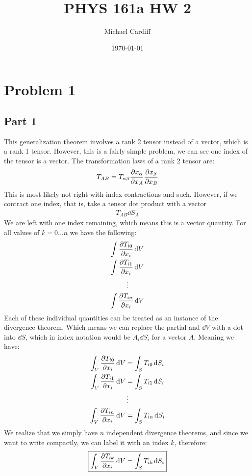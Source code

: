 \documentclass[12pt]{article}
\title{\vspace{-3em}PHYS 161a HW 2}
\author{Michael Cardiff}
\date{\today}
\begin{document}
\maketitle

\section*{Problem 1}
\subsection*{Part 1}
This generalization theorem involves a rank 2 tensor instead of a vector, which is a rank 1 tensor. However, this is a fairly simple problem, we can see one index of the tensor is a vector. The transformation laws of a rank 2 tensor are:
\begin{align*}
  T_{AB}=T_{\alpha\beta}\pdv{x_\alpha}{x_A}\pdv{x_\beta}{x_B}
\end{align*}
This is most likely not right with index contractions and such. However, if we contract one index, that is, take a tensor dot product with a vector
\begin{align*}
  T_{AB}\dd{S}_A
\end{align*}
We are left with one index remaining, which means this is a vector quantity. For all values of $k=0...n$ we have the following:
\begin{gather*}
  \int\pdv{T_{i0}}{x_i}\dd{V}\\
  \int\pdv{T_{i1}}{x_i}\dd{V}\\
  \vdots\\
  \int\pdv{T_{in}}{x_i}\dd{V}
\end{gather*}
Each of these individual quantities can be treated as an instance of the divergence theorem. Which means we can replace the partial and $\dd{V}$ with a dot into $\dd{S}$, which in index notation would be $A_i\dd{S_i}$ for a vector $A$. Meaning we have:
\begin{gather*}
  \int_V\pdv{T_{i0}}{x_i}\dd{V}=\int_S T_{i0}\dd{S_i}\\
  \int_V\pdv{T_{i1}}{x_i}\dd{V}=\int_S T_{i1}\dd{S_i}\\
  \vdots\\
  \int_V\pdv{T_{in}}{x_i}\dd{V}=\int_S T_{in}\dd{S_i}
\end{gather*}
We realize that we simply have $n$ independent divergence theorems, and since we want to write compactly, we can label it with an index $k$, therefore:
\begin{gather}
  \boxed{\int_V\pdv{T_{ik}}{x_i}\dd{V}=\int_S T_{ik}\dd{S_i}}
\end{gather}
\end{document}
